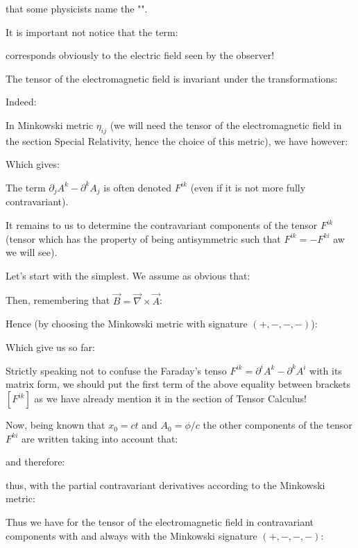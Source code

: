 	that some physicists name the "".	
	
	It is important not notice that the term:
	
	corresponds obviously  to the electric field seen by the observer!
	\begin{tcolorbox}	[title=Remark,colframe=black,arc=10pt]
	The tensor of the electromagnetic field is invariant under the transformations:
	
	Indeed:
	
	\end{tcolorbox}
	In Minkowski metric $\eta_{ij}$ (we will need the tensor of the electromagnetic field in the section Special Relativity, hence the choice of this metric), we have however:
	
	Which gives:
	
	The term $\partial_jA^k-\partial^k A_j$ is often denoted $F^{ik}$ (even if it is not more fully contravariant).

	It remains to us to determine the contravariant components of the tensor $F^{ik}$ (tensor which has the property of being antisymmetric such that $F^{ik}=-F^{ki}$ aw we will see).

	Let's start with the simplest. We assume as obvious that:
	
	Then, remembering that $\vec{B}=\vec{\nabla}\times\vec{A}$:
	
	Hence (by choosing the Minkowski metric with signature $(+, -, -, -)$):
	
	Which give us so far:
	
	\begin{tcolorbox}[title=Remark,colframe=black,arc=10pt]
	Strictly speaking not to confuse the Faraday's tenso $F^{ik}=\partial^iA^k-\partial^kA^i$ with its matrix form, we should put the first term of the above equality between brackets $[F^{ik}]$ as we have already mention it in the section of Tensor Calculus!
	\end{tcolorbox}
	Now, being known that $x_0=ct$ and $A_0=\phi/c$ the other components of the tensor $F^{ki}$ are written taking into account that:
	
	and therefore:
	
	thus, with the partial contravariant  derivatives according to the Minkowski metric:
	
	Thus we have for the tensor of the electromagnetic field in contravariant components with and always with the Minkowski signature $(+, -, -, -)$:
	
